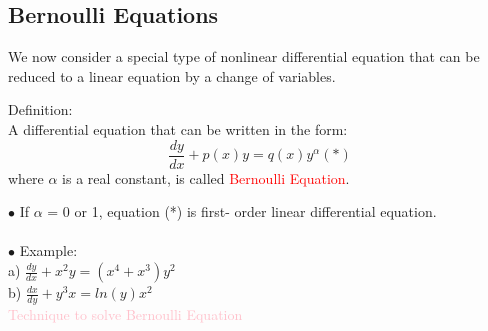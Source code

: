 \documentclass[12pt]{article}
\begin{document}
\subsection{Bernoulli Equations}
We now consider a special type of nonlinear differential equation that
can be reduced to a linear equation by a change of variables. 
\begin{mybox}
    Definition: \\
    A differential equation that can be written in the form: 
    $$\frac{dy}{dx} +p(x)y = q(x)y^\alpha (*)$$ 
    where $\alpha$ is a real constant, is called \textcolor{red}{Bernoulli Equation}.
\end{mybox}
$\bullet$ If $\alpha$ = 0 or 1, equation (*) is first- order linear differential equation.  \\
\\
$\bullet$ Example: 
\\
a)  $\displaystyle \frac{dy}{dx}+x^2y = (x^4+x^3)y^2$
\\
b) $\displaystyle \frac{dx}{dy} +y^3x = ln(y)x^2$
\\
\newpage
\textcolor{pink}{Technique to solve Bernoulli Equation}\\
\end{document}
